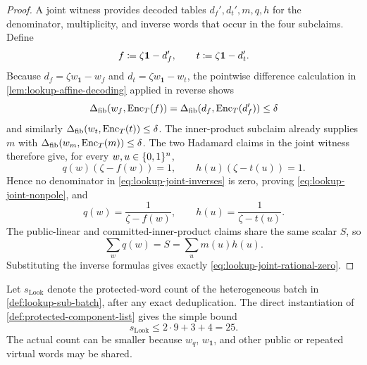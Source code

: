 \begin{proof}
A joint witness provides decoded tables $d_f',d_t',m,q,h$ for the denominator, multiplicity, and inverse words that occur in the four subclaims.  Define
\begin{equation}
  f\coloneqq\zeta\mathbf1-d_f',
  \qquad
  t\coloneqq\zeta\mathbf1-d_t'.
  \label{eq:lookup-joint-denominators}
\end{equation}
Because $d_f=\zeta w_{\mathbf1}-w_f$ and $d_t=\zeta w_{\mathbf1}-w_t$, the pointwise difference calculation in \cref{lem:lookup-affine-decoding} applied in reverse shows
\[
  \Delta_{\mathrm{fib}}(w_f,\operatorname{Enc}_T(f))
  =\Delta_{\mathrm{fib}}(d_f,\operatorname{Enc}_T(d_f'))\le\delta
\]
and similarly $\Delta_{\mathrm{fib}}(w_t,\operatorname{Enc}_T(t))\le\delta$.  The inner-product subclaim already supplies $m$ with $\Delta_{\mathrm{fib}}(w_m,\operatorname{Enc}_T(m))\le\delta$.  The two Hadamard claims in the joint witness therefore give, for every $w,u\in\{0,1\}^n$,
\begin{equation}
  q(w)(\zeta-f(w))=1,
  \qquad
  h(u)(\zeta-t(u))=1.
  \label{eq:lookup-joint-inverses}
\end{equation}
Hence no denominator in \eqref{eq:lookup-joint-inverses} is zero, proving \eqref{eq:lookup-joint-nonpole}, and
\[
  q(w)=\frac1{\zeta-f(w)},
  \qquad
  h(u)=\frac1{\zeta-t(u)}.
\]
The public-linear and committed-inner-product claims share the same scalar $S$, so
\[
  \sum_w q(w)
  =S
  =\sum_u m(u)h(u).
\]
Substituting the inverse formulas gives exactly \eqref{eq:lookup-joint-rational-zero}.
\end{proof}

Let $s_{\mathrm{Look}}$ denote the protected-word count of the heterogeneous batch in \cref{def:lookup-sub-batch}, after any exact deduplication.  The direct instantiation of \cref{def:protected-component-list} gives the simple bound
\begin{equation}
  s_{\mathrm{Look}}\le
  2\cdot9+3+4=25.
  \label{eq:lookup-protected-count}
\end{equation}
The actual count can be smaller because $w_q$, $w_{\mathbf1}$, and other public or repeated virtual words may be shared.

